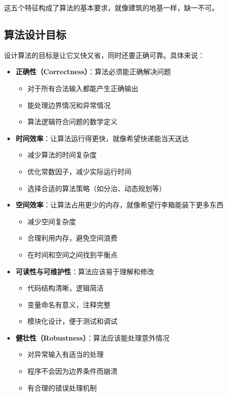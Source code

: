 \documentclass[lang=cn,newtx,10pt,scheme=chinese]{../elegantbook}
\begin{document}
这五个特征构成了算法的基本要求，就像建筑的地基一样，缺一不可。

\subsection{算法设计目标}
设计算法的目标是让它又快又省，同时还要正确可靠。具体来说：

\begin{itemize}
    \item \textbf{正确性（Correctness）}：算法必须能正确解决问题
    \begin{itemize}
        \item 对于所有合法输入都能产生正确输出
        \item 能处理边界情况和异常情况
        \item 算法逻辑符合问题的数学定义
    \end{itemize}
    
    \item \textbf{时间效率}：让算法运行得更快，就像希望快递能当天送达
    \begin{itemize}
        \item 减少算法的时间复杂度
        \item 优化常数因子，减少实际运行时间
        \item 选择合适的算法策略（如分治、动态规划等）
    \end{itemize}
    
    \item \textbf{空间效率}：让算法占用更少的内存，就像希望行李箱能装下更多东西
    \begin{itemize}
        \item 减少空间复杂度
        \item 合理利用内存，避免空间浪费
        \item 在时间和空间之间找到平衡点
    \end{itemize}
    
    \item \textbf{可读性与可维护性}：算法应该易于理解和修改
    \begin{itemize}
        \item 代码结构清晰，逻辑简洁
        \item 变量命名有意义，注释完整
        \item 模块化设计，便于测试和调试
    \end{itemize}
    
    \item \textbf{健壮性（Robustness）}：算法应该能处理意外情况
    \begin{itemize}
        \item 对异常输入有适当的处理
        \item 程序不会因为边界条件而崩溃
        \item 有合理的错误处理机制
    \end{itemize}
\end{itemize}
\end{document}
